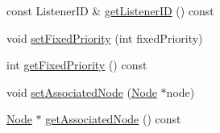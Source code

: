 \begin{DoxyCompactItemize}
\item 
const Listener\+ID \& \hyperlink{classEventListener_ad6a1e5ec2ed320b48801228317d56624}{get\+Listener\+ID} () const
\item 
void \hyperlink{classEventListener_a01a0f3888940db868f7428094e19fe4a}{set\+Fixed\+Priority} (int fixed\+Priority)
\item 
int \hyperlink{classEventListener_ab19a7deec6bb7d936573ec33eff96891}{get\+Fixed\+Priority} () const
\item 
void \hyperlink{classEventListener_a6d1e92c8e26170ac8ec877446f619120}{set\+Associated\+Node} (\hyperlink{classNode}{Node} $\ast$node)
\item 
\hyperlink{classNode}{Node} $\ast$ \hyperlink{classEventListener_a932ac8413ce8bec211320f36d8c30717}{get\+Associated\+Node} () const
\end{DoxyCompactItemize}
